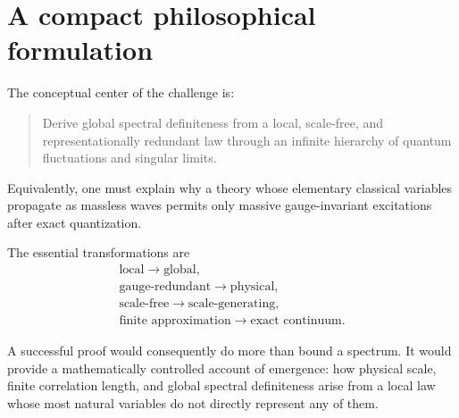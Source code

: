 \documentclass[11pt]{article}
\begin{document}
\section{A compact philosophical formulation}

The conceptual center of the challenge is:
\begin{quote}
Derive global spectral definiteness from a local, scale-free, and
representationally redundant law through an infinite hierarchy of quantum
fluctuations and singular limits.
\end{quote}
Equivalently, one must explain why a theory whose elementary classical
variables propagate as massless waves permits only massive gauge-invariant
excitations after exact quantization.

The essential transformations are
\begin{equation}
\boxed{
\begin{gathered}
  \text{local}\longrightarrow\text{global},\\
  \text{gauge-redundant}\longrightarrow\text{physical},\\
  \text{scale-free}\longrightarrow\text{scale-generating},\\
  \text{finite approximation}\longrightarrow\text{exact continuum}.
\end{gathered}}
\label{eq:four-transformations}
\end{equation}

A successful proof would consequently do more than bound a spectrum.  It would
provide a mathematically controlled account of emergence: how physical scale,
finite correlation length, and global spectral definiteness arise from a local
law whose most natural variables do not directly represent any of them.
\end{document}

